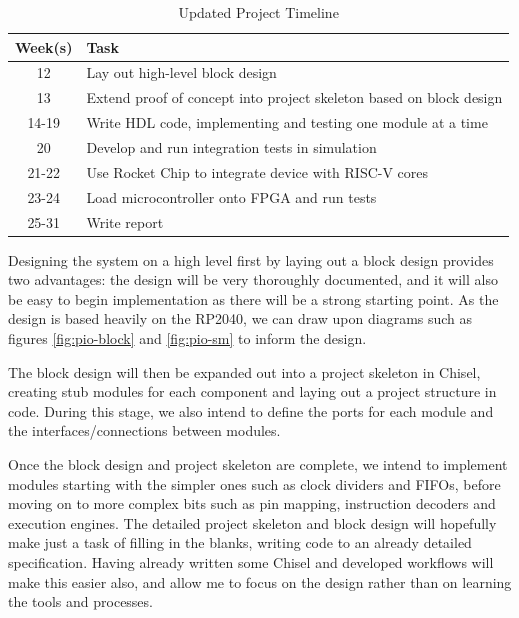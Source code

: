 \documentclass[a4paper,fleqn,12pt]{article}
\begin{document}
\begin{table}[ht!]
    \centering
    \begin{tabular}{|c|l|}
        \hline
        \textbf{Week(s)} & \textbf{Task}                                                       \\ \hline
        12               & Lay out high-level block design                                     \\ \hline
        13               & Extend proof of concept into project skeleton based on block design \\ \hline
        14-19            & Write HDL code, implementing and testing one module at a time       \\ \hline
        20               & Develop and run integration tests in simulation                     \\ \hline
        21-22            & Use Rocket Chip to integrate device with RISC-V cores               \\ \hline
        23-24            & Load microcontroller onto FPGA and run tests                        \\ \hline
        25-31            & Write report                                                        \\ \hline
    \end{tabular}
    \caption{Updated Project Timeline}
    \label{tab:timeline2}
\end{table}


Designing the system on a high level first by laying out a block design provides two advantages: the design will be very thoroughly documented, and it will also be easy to begin implementation as there will be a strong starting point. As the design is based heavily on the RP2040, we can draw upon diagrams such as figures \ref{fig:pio-block} and \ref{fig:pio-sm} to inform the design.

The block design will then be expanded out into a project skeleton in Chisel, creating stub modules for each component and laying out a project structure in code. During this stage, we also intend to define the ports for each module and the interfaces/connections between modules.

Once the block design and project skeleton are complete, we intend to implement modules starting with the simpler ones such as clock dividers and FIFOs, before moving on to more complex bits such as pin mapping, instruction decoders and execution engines. The detailed project skeleton and block design will hopefully make just a task of filling in the blanks, writing code to an already detailed specification. Having already written some Chisel and developed workflows will make this easier also, and allow me to focus on the design rather than on learning the tools and processes.
\end{document}
